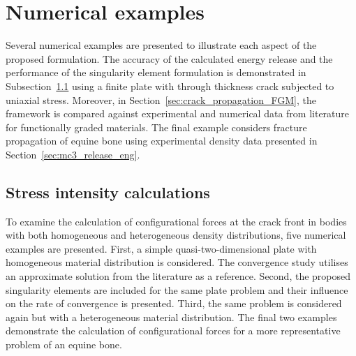 \documentclass[onecolumn]{svjour3}
\begin{document}
\section{Numerical examples}
\label{sec:numerical_examples}
Several numerical examples are presented to illustrate each aspect of the proposed formulation. 
The accuracy of the calculated energy release and the performance of the singularity element formulation is demonstrated in Subsection~\ref{sec:release_energy_rate} using a finite plate with through thickness crack subjected to uniaxial stress. Moreover, in Section~\ref{sec:crack_propagation_FGM}, 
the framework is compared against experimental and numerical data from literature for functionally graded materials.
The final example considers fracture propagation of equine bone using experimental density data presented in Section~\ref{sec:mc3_release_eng}. 
% 
% 
% 

\subsection{Stress intensity calculations}
\label{sec:release_energy_rate}
To examine the calculation of configurational forces at the crack front in bodies with both homogeneous and heterogeneous density distributions, five numerical examples are presented.
First, a simple quasi-two-dimensional plate with homogeneous material distribution is considered.  The convergence study utilises an approximate solution from the literature as a reference.
Second, the proposed singularity elements are included for the same plate problem and their influence on the rate of convergence is presented. 
Third, the same problem is considered again but with a heterogeneous material distribution.
The final two examples demonstrate the calculation of configurational forces for a more representative problem of an equine bone.
 
\end{document}
